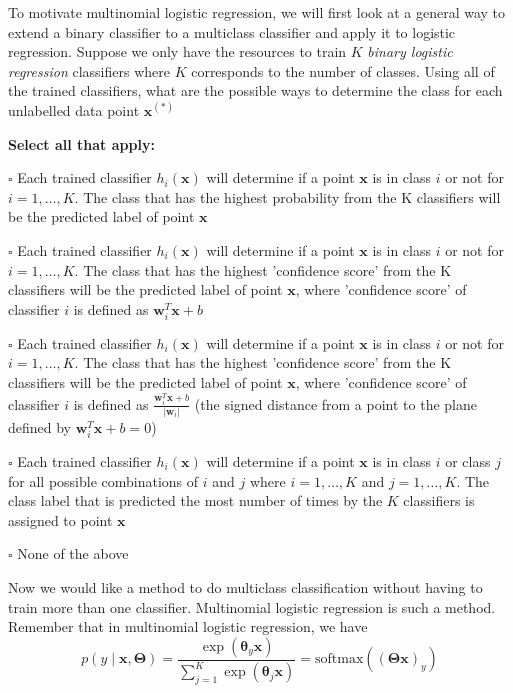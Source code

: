 \documentclass[11pt]{exam}
\numberwithin{equation}{section} %
\numberwithin{figure}{section} %
\numberwithin{table}{section} %
\newcommand{\wv}{\mathbf{w}}
\newcommand{\xv}{\mathbf{x}}
\newcommand{\thetav     }{\boldsymbol \theta     }
\newcommand{\Thetav     }{\boldsymbol \Theta     }
\begin{document}
\begin{questions}
    
    \question [2] To motivate multinomial logistic regression, we will first look at a general way to extend a binary classifier to a multiclass classifier and apply it to logistic regression. Suppose we only have the resources to train $K$ \emph{binary logistic regression} classifiers where $K$ corresponds to the number of classes. Using all of the trained classifiers, what are the possible ways to determine the class for each unlabelled data point $\xv^{(*)}$
    
    \textbf{Select all that apply:}
    \begin{list}{}
        \item $\square$  Each trained classifier $h_i(\xv)$  will determine if a point $\xv$ is in class $i$ or not for $i = 1, \ldots, K$. The class that has the highest probability from the K classifiers will be the predicted label of point $\xv$ 
        \item $\square$  Each trained classifier $h_i(\xv)$  will determine if a point $\xv$ is in class $i$ or not for $i = 1, \ldots, K$. The class that has the highest 'confidence score' from the K classifiers will be the predicted label of point $\xv$, where 'confidence score' of classifier $i$ is defined as $\wv^T_i \xv + b$
        \item $\square$  Each trained classifier $h_i(\xv)$  will determine if a point $\xv$ is in class $i$ or not for $i = 1, \ldots, K$. The class that has the highest 'confidence score' from the K classifiers will be the predicted label of point $\xv$, where 'confidence score' of classifier $i$ is defined as $\frac{\wv^T_i \xv + b}{| \wv_i |}$ (the signed distance from a point to the plane defined by $\wv_i^T \xv + b = 0$)   
        \item $\square$ Each trained classifier $h_i(\xv)$  will determine if a point $\xv$ is in class $i$ or class $j$ for all possible combinations of $i$ and $j$ where $i = 1, \ldots, K$ and  $j = 1, \ldots, K$. The class label that is predicted the most number of times by the $K$ classifiers is assigned to point $\xv$
        \item $\square$ None of the above
    \end{list}
    
    
    \question [1] Now we would like a method to do multiclass classification without having to train more than one classifier. Multinomial logistic regression is such a method. Remember that in multinomial logistic regression, we have
    \begin{equation} \label{eq:1}
        p\left(y \mid \xv, \Thetav\right) = \frac{\exp\left(\thetav_{y} \xv \right)}{\sum_{j = 1}^K \exp\left(\thetav_{j} \xv\right)} = \text{softmax}((\Thetav \xv)_y)
    \end{equation}


\end{questions}
\end{document}

